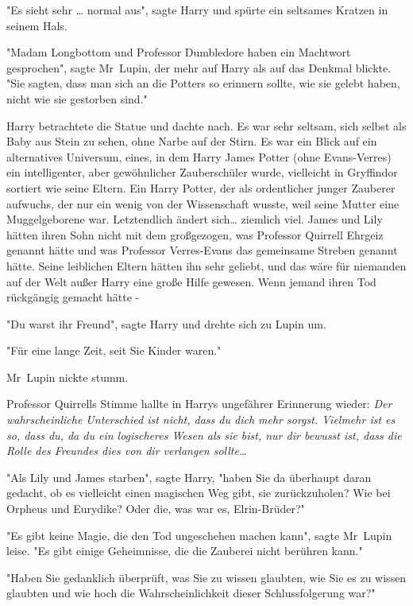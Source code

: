 {"Es sieht sehr … normal aus", sagte Harry und spürte ein seltsames Kratzen in seinem Hals.

"Madam Longbottom und Professor Dumbledore haben ein Machtwort gesprochen", sagte Mr~Lupin, der mehr auf Harry als auf das Denkmal blickte. "Sie sagten, dass man sich an die Potters so erinnern sollte, wie sie gelebt haben, nicht wie sie gestorben sind."

Harry betrachtete die Statue und dachte nach. Es war sehr seltsam, sich selbst als Baby aus Stein zu sehen, ohne Narbe auf der Stirn. Es war ein Blick auf ein alternatives Universum, eines, in dem Harry James Potter (ohne Evans-Verres) ein intelligenter, aber gewöhnlicher Zauberschüler wurde, vielleicht in Gryffindor sortiert wie seine Eltern. Ein Harry Potter, der als ordentlicher junger Zauberer aufwuchs, der nur ein wenig von der Wissenschaft wusste, weil seine Mutter eine Muggelgeborene war. Letztendlich ändert sich… ziemlich viel. James und Lily hätten ihren Sohn nicht mit dem großgezogen, was Professor Quirrell Ehrgeiz genannt hätte und was Professor Verres-Evans das gemeinsame Streben genannt hätte. Seine leiblichen Eltern hätten ihn sehr geliebt, und das wäre für niemanden auf der Welt außer Harry eine große Hilfe gewesen. Wenn jemand ihren Tod rückgängig gemacht hätte -

"Du warst ihr Freund", sagte Harry und drehte sich zu Lupin um.

"Für eine lange Zeit, seit Sie Kinder waren."

Mr~Lupin nickte stumm.

Professor Quirrells Stimme hallte in Harrys ungefährer Erinnerung wieder: \emph{Der wahrscheinliche Unterschied ist nicht, dass du dich mehr sorgst. Vielmehr ist es so, dass du, da du ein logischeres Wesen als sie bist, nur dir bewusst ist, dass die Rolle des Freundes dies von dir verlangen sollte…}

"Als Lily und James starben", sagte Harry, "haben Sie da überhaupt daran gedacht, ob es vielleicht einen magischen Weg gibt, sie zurückzuholen? Wie bei Orpheus und Eurydike? Oder die, was war es, Elrin-Brüder?"

"Es gibt keine Magie, die den Tod ungeschehen machen kann", sagte Mr~Lupin leise. "Es gibt einige Geheimnisse, die die Zauberei nicht berühren kann."

"Haben Sie gedanklich überprüft, was Sie zu wissen glaubten, wie Sie es zu wissen glaubten und wie hoch die Wahrscheinlichkeit dieser Schlussfolgerung war?"

}
